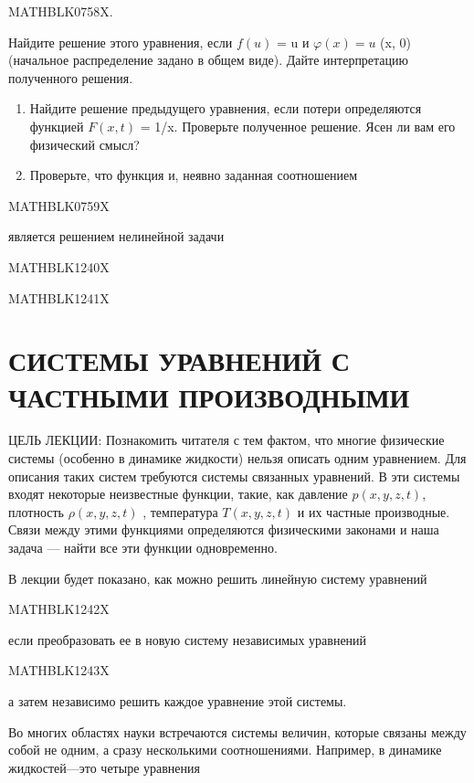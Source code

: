\documentclass[
]{article}
\begin{document}
{{{MATHBLK0758X.

Найдите решение этого уравнения, если \(f(u)\) = u и \(\varphi(x) = u\)
(x, 0) (начальное распределение задано в общем виде). Дайте
интерпретацию полученного решения.

\begin{enumerate}
\def\labelenumi{\arabic{enumi}.}
\setcounter{enumi}{3}
\item
  Найдите решение предыдущего уравнения, если потери определяются
  функцией \(F(x, t)\) = 1/x. Проверьте полученное решение. Ясен ли вам
  его физический смысл?
\item
  Проверьте, что функция и, неявно заданная соотношением
\end{enumerate}

MATHBLK0759X

является решением нелинейной задачи

MATHBLK1240X

MATHBLK1241X

\section{СИСТЕМЫ УРАВНЕНИЙ С ЧАСТНЫМИ
ПРОИЗВОДНЫМИ}\label{ux441ux438ux441ux442ux435ux43cux44b-ux443ux440ux430ux432ux43dux435ux43dux438ux439-ux441-ux447ux430ux441ux442ux43dux44bux43cux438-ux43fux440ux43eux438ux437ux432ux43eux434ux43dux44bux43cux438}

ЦЕЛЬ ЛЕКЦИИ: Познакомить читателя с тем фактом, что многие физические
системы (особенно в динамике жидкости) нельзя описать одним уравнением.
Для описания таких систем требуются системы связанных уравнений. В эти
системы входят некоторые неизвестные функции, такие, как давление
\(p(x, y, z, t)\), плотность \(\rho(x, y, z, t)\) , температура
\(T(x, y, z, t)\) и их частные производные. Связи между этими функциями
определяются физическими законами и наша задача --- найти все эти
функции одновременно.

В лекции будет показано, как можно решить линейную систему уравнений

MATHBLK1242X

если преобразовать ее в новую систему независимых уравнений

MATHBLK1243X

а затем независимо решить каждое уравнение этой системы.

Во многих областях науки встречаются системы величин, которые связаны
между собой не одним, а сразу несколькими соотношениями. Например, в
динамике жидкостей---это четыре уравнения

}}}
\end{document}
